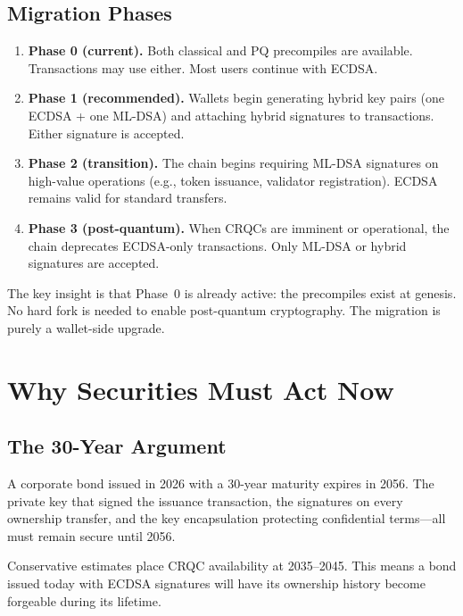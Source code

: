 \documentclass[11pt,a4paper]{article}
\begin{document}
\subsection{Migration Phases}

\begin{enumerate}[nosep]
  \item \textbf{Phase 0 (current).}  Both classical and PQ precompiles
        are available.  Transactions may use either.  Most users
        continue with ECDSA.
  \item \textbf{Phase 1 (recommended).}  Wallets begin generating
        hybrid key pairs (one ECDSA + one ML-DSA) and attaching hybrid
        signatures to transactions.  Either signature is accepted.
  \item \textbf{Phase 2 (transition).}  The chain begins requiring
        ML-DSA signatures on high-value operations (e.g., token
        issuance, validator registration).  ECDSA remains valid for
        standard transfers.
  \item \textbf{Phase 3 (post-quantum).}  When CRQCs are imminent or
        operational, the chain deprecates ECDSA-only transactions.
        Only ML-DSA or hybrid signatures are accepted.
\end{enumerate}

The key insight is that Phase~0 is already active: the precompiles
exist at genesis.  No hard fork is needed to enable post-quantum
cryptography.  The migration is purely a wallet-side upgrade.

\section{Why Securities Must Act Now}
\label{sec:urgency}

\subsection{The 30-Year Argument}

A corporate bond issued in 2026 with a 30-year maturity expires in
2056.  The private key that signed the issuance transaction, the
signatures on every ownership transfer, and the key encapsulation
protecting confidential terms---all must remain secure until 2056.

Conservative estimates place CRQC availability at 2035--2045.  This
means a bond issued today with ECDSA signatures will have its
ownership history become forgeable during its lifetime.
\end{document}
